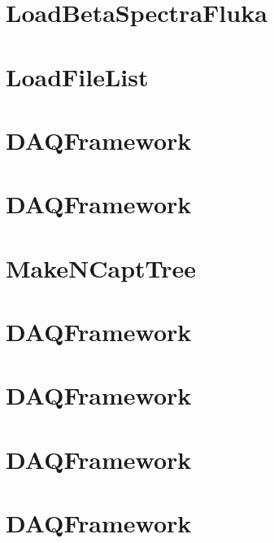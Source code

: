\let\mypdfximage\pdfximage\def\pdfximage{\immediate\mypdfximage}\documentclass[twoside]{book}
\newcommand{\+}{\discretionary{\mbox{\scriptsize$\hookleftarrow$}}{}{}}
\begin{document}
\chapter{Load\+Beta\+Spectra\+Fluka}
\label{md_UserTools_LoadBetaSpectraFluka_README}

\chapter{Load\+File\+List}
\label{md_UserTools_LoadFileList_README}

\chapter{DAQFramework}
\label{md_UserTools_LoadSubTrigger_README}

\chapter{DAQFramework}
\label{md_UserTools_MakeBDTOutputFile_README}

\chapter{Make\+NCapt\+Tree}
\label{md_UserTools_MakeNCaptTree_README}

\chapter{DAQFramework}
\label{md_UserTools_MakeSpectralFitHistos_README}

\chapter{DAQFramework}
\label{md_UserTools_MCCuts_README}

\chapter{DAQFramework}
\label{md_UserTools_muechk_README}

\chapter{DAQFramework}
\label{md_UserTools_mufit_sk4_README}

\end{document}
